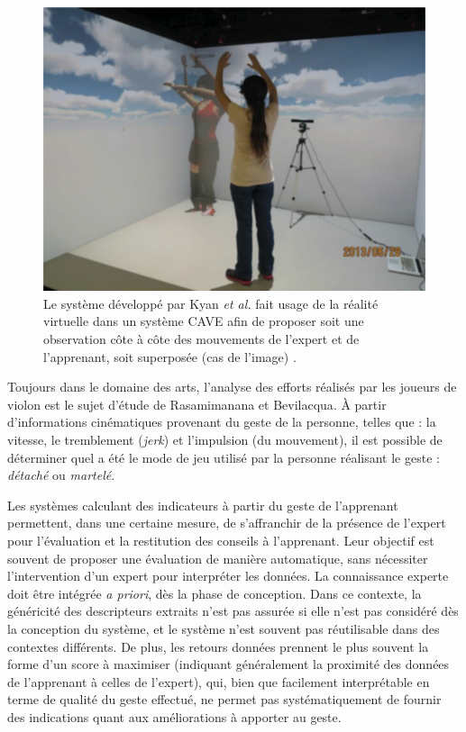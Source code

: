 \begin{figure}
    \centering
    \includegraphics[width=\textwidth]{pictures/dance_cave_TEL.png}
    \caption[Système d'apprentissage de mouvement utilisant un CAVE pour la captation et la comparaison \parencite{Kyan2015ABD}]{Le système développé par Kyan \textit{et al.} fait usage de la réalité virtuelle dans un système CAVE afin de proposer soit une observation côte à côte des mouvements de l'expert et de l'apprenant, soit superposée (cas de l'image) \parencite{Kyan2015ABD}.}
    \label{fig:dance_cave_TEL}
\end{figure}

Toujours dans le domaine des arts, l'analyse des efforts réalisés par les joueurs de violon est le sujet d'étude de Rasamimanana et Bevilacqua\parencite{Rasamimanana2008EbA}. À partir d'informations cinématiques provenant du geste de la personne, telles que : la vitesse, le tremblement (\textit{jerk}) et l'impulsion (du mouvement), il est possible de déterminer quel a été le mode de jeu utilisé par la personne réalisant le geste : \textit{détaché} ou \textit{martelé}.

Les systèmes calculant des indicateurs à partir du geste de l'apprenant permettent, dans une certaine mesure, de s'affranchir de la présence de l'expert pour l'évaluation et la restitution des conseils à l'apprenant. Leur objectif est souvent de proposer une évaluation de manière automatique, sans nécessiter l'intervention d'un expert pour interpréter les données. La connaissance experte doit être intégrée \textit{a priori}, dès la phase de conception. Dans ce contexte, la généricité des descripteurs extraits n'est pas assurée si elle n'est pas considéré dès la conception du système, et le système n'est souvent pas réutilisable dans des contextes différents. De plus, les retours données prennent le plus souvent la forme d'un score à maximiser (indiquant généralement la proximité des données de l'apprenant à celles de l'expert), qui, bien que facilement interprétable en terme de qualité du geste effectué, ne permet pas systématiquement de fournir des indications quant aux améliorations à apporter au geste.



